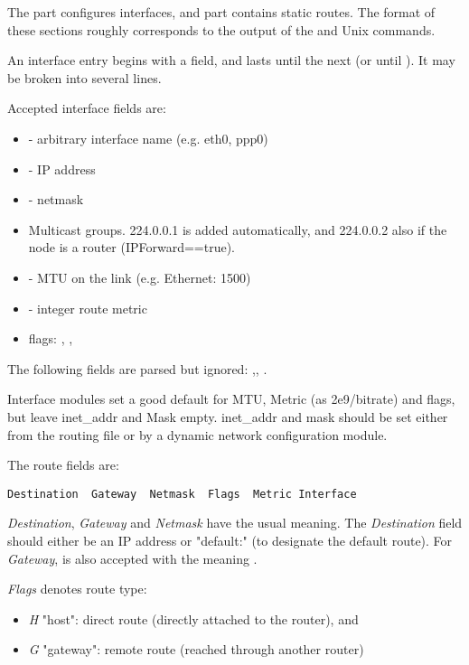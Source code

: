 The  part configures interfaces,
and  part contains static routes.
The format of these sections roughly corresponds to the output
of the  and  Unix commands.

An interface entry begins with a  field, and lasts until
the next  (or until ). It may
be broken into several lines.

Accepted interface fields are:

\begin{itemize}
  \item {} - arbitrary interface name (e.g. eth0, ppp0)
  \item {} - IP address
  \item {} - netmask
  \item {} Multicast groups. 224.0.0.1 is added automatically,
     and 224.0.0.2 also if the node is a router (IPForward==true).
  \item {} - MTU on the link (e.g. Ethernet: 1500)
  \item {} - integer route metric
  \item flags: , , 
\end{itemize}

The following fields are parsed but ignored: ,,
.

Interface modules set a good default for MTU, Metric (as 2e9/bitrate) and
flags, but leave inet\_addr and Mask empty. inet\_addr and mask should
be set either from the routing file or by a dynamic network configuration
module.

The route fields are:

\begin{verbatim}
Destination  Gateway  Netmask  Flags  Metric Interface
\end{verbatim}

\textit{Destination}, \textit{Gateway} and \textit{Netmask} have the usual meaning.
The \textit{Destination} field should either be an IP address or "default:"
(to designate the default route). For \textit{Gateway}, \ttt{*} is also
accepted with the meaning .

\textit{Flags} denotes route type:

\begin{itemize}
  \item \textit{H} "host": direct route (directly attached to the router), and
  \item \textit{G} "gateway": remote route (reached through another router)
\end{itemize}


